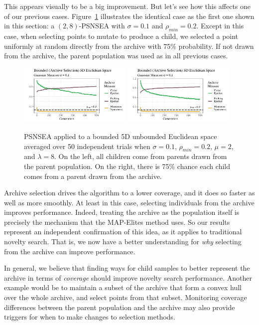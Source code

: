 \documentclass[twoside]{article}
\begin{document}
This appears visually to be a big improvement.  But let's see how this affects one of our previous cases.  Figure~\ref{fig:bounded:viz:mu2lam8:0102} illustrates the identical case as the first one shown in this section:  a $(2,8)$-PSNSEA with $\sigma=0.1$ and $\rho_{min}=0.2$.  Except in this case, when selecting points to mutate to produce a child, we selected a point uniformly at random directly from the archive with 75\% probability.  If not drawn from the archive, the parent population was used as in all previous cases.
%
\begin{figure}[ht]
  \includegraphics[width=0.48\textwidth]{Figures/bounded-500-s01r02-mu2lam8.pdf}
  \includegraphics[width=0.48\textwidth]{Figures/boundedrv-500-vizexamp-mu2lam8-full.pdf}
  \caption{\label{fig:bounded:viz:mu2lam8:0102} PSNSEA applied to a bounded 5D unbounded Euclidean space averaged over 50 independent trials when $\sigma=0.1$, $\rho_{min}=0.2$, $\mu=2$, and $\lambda=8$.  On the left, all children come from parents drawn from the parent population.  On the right, there is 75\% chance each child comes from a parent drawn from the archive.}
\end{figure}

Archive selection drives the algorithm to a lower coverage, and it does so faster as well as more smoothly.  At least in this case, selecting individuals from the archive improves performance.  Indeed, treating the archive as the population itself is precisely the mechanism that the MAP-Elites method uses.  So our results represent an independent confirmation of this idea, as it applies to traditional novelty search.  That is, we now have a better understanding for \emph{why} selecting from the archive can improve performance.

In general, we believe that finding ways for child samples to better represent the archive in terms of \emph{coverage} should improve novelty search performance.  Another example would be to maintain a subset of the archive that form a convex hull over the whole archive, and select points from that subset.  Monitoring coverage differences between the parent population and the archive may also provide triggers for when to make changes to selection methods.
\end{document}
